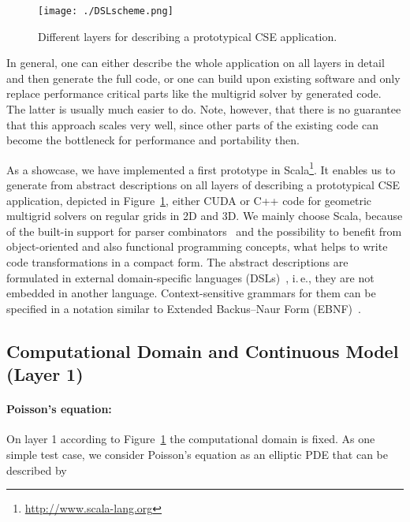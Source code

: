 \documentclass[onecolumn]{svjour3}
\begin{document}
\begin{figure}[ht!]
\begin{center}
\texttt{[image: ./DSLscheme.png]}
\caption[Partitioning of a cell-centered grid into four sub-grids]{Different layers for describing a prototypical CSE application.}
\label{fig:applevels}
\end{center}
\end{figure}

In general, one can either describe the whole application on all layers in detail and then generate the full code, or one can build upon existing software and only replace performance critical parts like the multigrid solver by generated code. The latter is usually much easier to do. Note, however, that there is no guarantee that this approach scales very well, since other parts of the existing code can become the bottleneck for performance and portability then. 

As a showcase, we have implemented a first prototype in Scala\footnote{\url{http://www.scala-lang.org}}. It enables us to generate from abstract descriptions on all layers of describing a prototypical CSE application, depicted in Figure~\ref{fig:applevels}, either CUDA or C++ code for geometric multigrid solvers on regular grids in 2D and 3D.
We mainly choose Scala, because of the built-in support for parser combinators~\cite{odersky2008programming} and the possibility to benefit from object-oriented and also functional programming concepts, what helps to write code transformations in a compact form. The abstract descriptions are formulated in external domain-specific languages (DSLs)~\cite{ghosh2010dsls}, i.\,e., they are not embedded in another language. Context-sensitive grammars for them can be specified in a notation similar to Extended Backus–Naur Form (EBNF)~\cite{garshol2003bnf}.  



\subsection{Computational Domain and Continuous Model (Layer 1)}

\paragraph{Poisson's equation:} On layer 1 according to Figure~\ref{fig:applevels} the computational domain is fixed. As one simple test case, we consider Poisson's equation as an elliptic PDE that can be described by  
  
\end{document}
